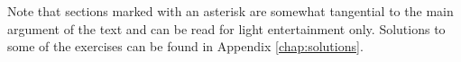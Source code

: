 \documentclass[11pt,a4paper]{book}
\begin{document}
Note that sections marked with an asterisk are somewhat tangential to the main argument of the text and can be read for light entertainment only. Solutions to some of the exercises can be found in Appendix \ref{chap:solutions}.


































\end{document}
